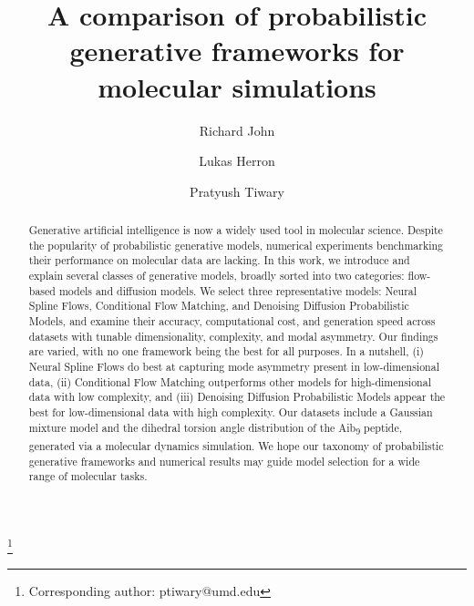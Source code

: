 \documentclass[%
 aip,
 amsmath,amssymb,
 reprint,%
]{revtex4-1}
\begin{document}
\title{A comparison of probabilistic generative frameworks for molecular simulations}

\author{Richard John}
\author{Lukas Herron}
\author{Pratyush Tiwary}
\thanks{Corresponding author: ptiwary@umd.edu}

\begin{abstract}
Generative artificial intelligence is now a widely used tool in molecular science. Despite the popularity of probabilistic generative models, numerical experiments benchmarking their performance on molecular data are lacking. In this work, we introduce and explain several classes of generative models, broadly sorted into two categories: flow-based models and diffusion models. We select three representative models: Neural Spline Flows, Conditional Flow Matching, and Denoising Diffusion Probabilistic Models, and examine their accuracy, computational cost, and generation speed across datasets with tunable dimensionality, complexity, and modal asymmetry. Our findings are varied, with no one framework being the best for all purposes. In a nutshell, (i) Neural Spline Flows do best at capturing mode asymmetry present in low-dimensional data, (ii) Conditional Flow Matching outperforms other models for high-dimensional data with low complexity, and (iii) Denoising Diffusion Probabilistic Models appear the best for low-dimensional data with high complexity. Our datasets include a Gaussian mixture model and the dihedral torsion angle distribution of the Aib\textsubscript{9} peptide, generated via a molecular dynamics simulation. We hope our taxonomy of probabilistic generative frameworks and numerical results may guide model selection for a wide range of molecular tasks.
\end{abstract}

\maketitle
\end{document}
